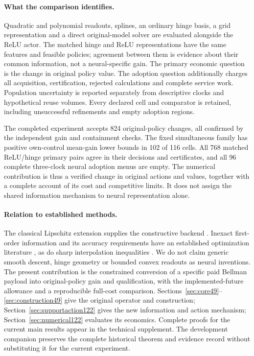 \paragraph{What the comparison identifies.}
Quadratic and polynomial readouts, splines, an ordinary hinge basis, a grid
representation and a direct original-model solver are evaluated alongside the
ReLU actor. The matched hinge and ReLU representations have the same features
and feasible policies; agreement between them is evidence about their common
information, not a neural-specific gain. The primary economic question is the
change in original policy value. The adoption question additionally charges
all acquisition, certification, rejected calculations and complete service
work. Population uncertainty is reported separately from descriptive clocks
and hypothetical reuse volumes. Every declared cell and comparator is retained,
including unsuccessful refinements and empty adoption regions.

The completed experiment accepts 824 original-policy changes, all confirmed
by the independent gain and containment checks. The fixed simultaneous
family has positive own-control mean-gain lower bounds in 102 of 116 cells.
All 768 matched ReLU/hinge primary pairs agree in their decisions and
certificates, and all 96 complete three-clock neural adoption menus are
empty. The numerical contribution is thus a verified change in original
actions and values, together with a complete account of its cost and
competitive limits. It does not assign the shared information mechanism
to neural representation alone.

\paragraph{Relation to established methods.}
The classical Lipschitz extension supplies the constructive backend
\citep{mcshane1934}. Inexact first-order information and its accuracy requirements
have an established optimization literature \citep{DGN2014Inexact122}, as do
sharp interpolation inequalities \citep{THG2017Interpolation122}. We do not
claim generic smooth descent, hinge geometry or bounded convex readouts as
neural inventions. The present contribution is the constrained conversion of a
specific paid Bellman payload into original-policy gain and qualification,
with the implemented-future allowance and a reproducible full-cost comparison.
Sections~\ref{sec:core49}--\ref{sec:construction49} give the original operator
and construction; Section~\ref{sec:supportaction122} gives the new information
and action mechanism; Section~\ref{sec:numerical122} evaluates its economics.
Complete proofs for the current main results appear in the technical supplement.
The development companion
preserves the complete historical theorem and evidence record without
substituting it for the current experiment.
